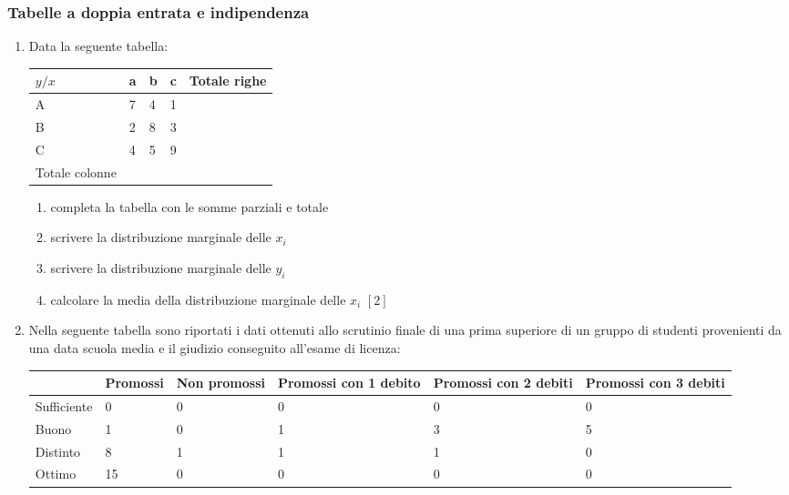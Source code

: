\subsubsection{Tabelle a doppia entrata e indipendenza}
\begin{enumerate}
\item Data la seguente tabella:\\
\begin{tabular}{|p{2cm}|p{2cm}|p{2cm}|p{2cm}|p{2.5cm}|}
\hline
$y/x$ & a &     b &     c &     Totale righe\\
\hline
A&      7&      4&      1&      \\
\hline
B&      2&      8&      3&      \\
\hline
C&      4&      5       &9 & \\
\hline
Totale colonne & & & & \\
\hline
\end{tabular}
\begin{enumerate}
        \item completa la tabella con le somme parziali e totale
        \item scrivere la distribuzione marginale delle $x_i$
        \item scrivere la distribuzione marginale delle $y_i$
        \item calcolare la media della distribuzione marginale delle $x_i$ 
\hfill $[2]$
\end{enumerate}
\item Nella seguente tabella sono riportati i dati ottenuti allo scrutinio 
finale di una prima superiore di un gruppo di studenti provenienti da una 
data scuola media e il giudizio conseguito all'esame di licenza:\\
\begin{tabular}{|p{1.7cm}|p{1.7cm}|p{1.7cm}|p{1.7cm}|p{1.7cm}|p{1.7cm}|}
        \hline

&Promossi &     Non promossi &  Promossi con 1 debito & Promossi con 2 
debiti &        Promossi con 3 debiti\\
\hline
Sufficiente     &0&     0&      0       &0      &0\\
\hline
Buono&  1&      0&      1&      3&      5\\
        \hline
Distinto&       8&      1&      1&      1&      0\\
        \hline
Ottimo& 15&     0&      0       &0      &0\\
        \hline
\end{tabular}


\end{enumerate}
